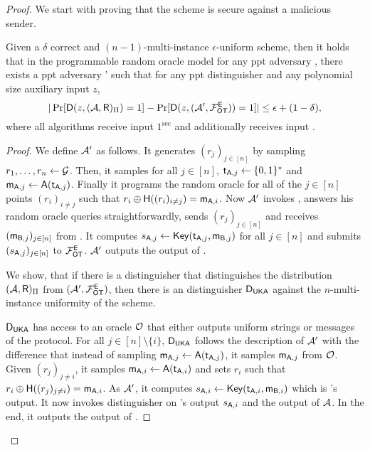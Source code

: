 \begin{proof}
We start with proving that the scheme is secure against a malicious sender. 
\begin{claim}\label{claim:malsender}
Given a $\delta$ correct and  $(n-1)$-multi-instance $\epsilon$-uniform \UKA scheme, then it holds that in the programmable random oracle model for any ppt adversary \Adv, there exists a ppt adversary \Adv' such that for any ppt distinguisher \D and any polynomial size auxiliary input $z$,
$$
|\Pr[\mathsf D(z,(\mathcal{A},\mathsf{R})_{\Pi})=1] -\Pr[\mathsf D(z, (\mathcal{A}', \mathcal{F}_{\mathsf{OT}}^\mathsf{E}))=1]|\leq \epsilon+(1-\delta),
$$
where all algorithms receive input $1^\sec$ and \rec additionally receives input \set.
\end{claim}

\begin{proof}
We define $\mathcal{A}'$ as follows. 
It generates $(r_j)_{j\in[n]}$ by sampling $r_1,\dots, r_n\leftarrow \mathcal{G}$. Then, it samples for all $j\in[n]$, $\mathsf{t}_{\mathsf{A},j}\leftarrow\{0,1\}^*$ and $\mathsf{m}_{\mathsf{A},j}\leftarrow\mathsf{A}(\mathsf{t}_{\mathsf{A},j})$. Finally it programs the random oracle for all of the $j\in[n]$ points $(r_i)_{i\neq j}$ such that $r_i\oplus\mathsf{H}((r_i)_{i\neq j})=\mathsf{m}_{\mathsf{A},i}$. Now $\mathcal{A}'$ invokes \Adv, answers his random oracle queries straightforwardly, sends $(r_j)_{j\in[n]}$ and receives $(\mathsf{m}_{\mathsf{B},j})_{j\in[n]}$ from \Adv. It computes $s_{\mathsf{A},j}\leftarrow\mathsf{Key}(\mathsf{t}_{\mathsf{A},j},\mathsf{m}_{\mathsf{B},j})$ for all $j\in[n]$ and submits $(s_{\mathsf{A},j})_{j\in [n]}$ to $\mathcal{F}_{\mathsf{OT}}^{\mathsf{E}}$. $\mathcal{A}'$ outputs the output of \Adv.

We show, that if there is a distinguisher \D that distinguishes the distribution $(\mathcal{A},\mathsf{R})_{\Pi}$ from $(\mathcal{A}',\mathcal{F}_{\mathsf{OT}}^{\mathsf{E}})$, then there is an distinguisher $\mathsf D_{\mathsf{UKA}}$ against the $n$-multi-instance uniformity of the \UKA scheme. 

$\mathsf D_{\mathsf{UKA}}$ has access to an oracle $\mathcal{O}$ that either outputs uniform strings or messages of the \UKA protocol. For all $j\in[n]\setminus\{i\}$, $\mathsf D_{\mathsf{UKA}}$ follows the description of $\mathcal{A}'$ with the difference that instead of sampling  $\mathsf{m}_{\mathsf{A},j}\leftarrow\mathsf{A}(\mathsf{t}_{\mathsf{A},j})$, it samples $\mathsf{m}_{\mathsf{A},j}$ from $\mathcal{O}$. Given $(r_j)_{j\neq i}$, it samples $\mathsf{m}_{\mathsf{A},i}\leftarrow\mathsf{A}(\mathsf{t}_{\mathsf{A},i})$ and sets $r_i$ such that $r_i\oplus\mathsf{H}((r_j)_{j\neq i})=\mathsf{m}_{\mathsf{A},i}$. As $\mathcal{A}'$, it computes $s_{\mathsf{A},i}\leftarrow\mathsf{Key}(\mathsf{t}_{\mathsf{A},i},\mathsf{m}_{\mathsf{B},i})$ which is \rec's output. It now invokes distinguisher \D on \rec's output $s_{\mathsf{A},i}$ and the output of $\mathcal{A}$. In the end, it outputs the output of \D.



\end{proof}
\end{proof}
